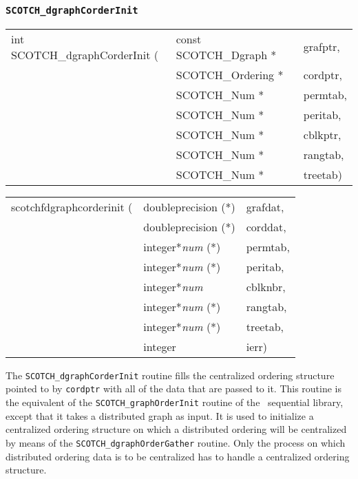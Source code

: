 \subsubsection{{\tt SCOTCH\_dgraphCorderInit}}
\label{sec-lib-graph-corder-init}

\begin{itemize}
\progsyn

{\tt\begin{tabular}{l@{}ll}
int SCOTCH\_dgraphCorderInit ( & const SCOTCH\_Dgraph * & grafptr, \\
                               & SCOTCH\_Ordering *     & cordptr, \\
                               & SCOTCH\_Num *          & permtab, \\
                               & SCOTCH\_Num *          & peritab, \\
                               & SCOTCH\_Num *          & cblkptr, \\
                               & SCOTCH\_Num *          & rangtab, \\
                               & SCOTCH\_Num *          & treetab)
\end{tabular}}

{\tt\begin{tabular}{l@{}ll}
scotchfdgraphcorderinit ( & doubleprecision (*)   & grafdat, \\
                          & doubleprecision (*)   & corddat, \\
                          & integer*{\it num} (*) & permtab, \\
                          & integer*{\it num} (*) & peritab, \\
                          & integer*{\it num}     & cblknbr, \\
                          & integer*{\it num} (*) & rangtab, \\
                          & integer*{\it num} (*) & treetab, \\
                          & integer               & ierr)
\end{tabular}}

\progdes

The {\tt SCOTCH\_dgraph\lbt Corder\lbt Init} routine fills the
centralized ordering structure pointed to by {\tt cordptr} with all of
the data that are passed to it. This routine is the equivalent of the
{\tt SCOTCH\_\lbt graph\lbt Order\lbt Init} routine of the
\scotch\ sequential library, except that it takes a distributed graph
as input. It is used to initialize a centralized ordering structure on
which a distributed ordering will be centralized by means of the
{\tt SCOTCH\_\lbt dgraph\lbt Order\lbt Gather} routine. Only the
process on which distributed ordering data is to be centralized has
to handle a centralized ordering structure.


\end{itemize}

